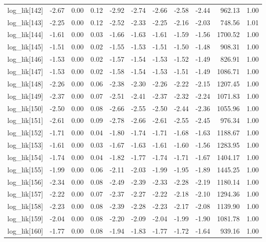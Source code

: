 \begin{table}[ht]
\begin{tabular}{rrrrrrrrrrr}
  log\_lik[142] & -2.67 & 0.00 & 0.12 & -2.92 & -2.74 & -2.66 & -2.58 & -2.44 & 962.13 & 1.00 \\ 
  log\_lik[143] & -2.25 & 0.00 & 0.12 & -2.52 & -2.33 & -2.25 & -2.16 & -2.03 & 748.56 & 1.01 \\ 
  log\_lik[144] & -1.61 & 0.00 & 0.03 & -1.66 & -1.63 & -1.61 & -1.59 & -1.56 & 1700.52 & 1.00 \\ 
  log\_lik[145] & -1.51 & 0.00 & 0.02 & -1.55 & -1.53 & -1.51 & -1.50 & -1.48 & 908.31 & 1.00 \\ 
  log\_lik[146] & -1.53 & 0.00 & 0.02 & -1.57 & -1.54 & -1.53 & -1.52 & -1.49 & 826.91 & 1.00 \\ 
  log\_lik[147] & -1.53 & 0.00 & 0.02 & -1.58 & -1.54 & -1.53 & -1.51 & -1.49 & 1086.71 & 1.00 \\ 
  log\_lik[148] & -2.26 & 0.00 & 0.06 & -2.38 & -2.30 & -2.26 & -2.22 & -2.15 & 1207.45 & 1.00 \\ 
  log\_lik[149] & -2.37 & 0.00 & 0.07 & -2.51 & -2.41 & -2.37 & -2.32 & -2.24 & 1071.83 & 1.00 \\ 
  log\_lik[150] & -2.50 & 0.00 & 0.08 & -2.66 & -2.55 & -2.50 & -2.44 & -2.36 & 1055.96 & 1.00 \\ 
  log\_lik[151] & -2.61 & 0.00 & 0.09 & -2.78 & -2.66 & -2.61 & -2.55 & -2.45 & 976.34 & 1.00 \\ 
  log\_lik[152] & -1.71 & 0.00 & 0.04 & -1.80 & -1.74 & -1.71 & -1.68 & -1.63 & 1188.67 & 1.00 \\ 
  log\_lik[153] & -1.61 & 0.00 & 0.03 & -1.67 & -1.63 & -1.61 & -1.60 & -1.56 & 1283.95 & 1.00 \\ 
  log\_lik[154] & -1.74 & 0.00 & 0.04 & -1.82 & -1.77 & -1.74 & -1.71 & -1.67 & 1404.17 & 1.00 \\ 
  log\_lik[155] & -1.99 & 0.00 & 0.06 & -2.11 & -2.03 & -1.99 & -1.95 & -1.89 & 1445.25 & 1.00 \\ 
  log\_lik[156] & -2.34 & 0.00 & 0.08 & -2.49 & -2.39 & -2.33 & -2.28 & -2.19 & 1180.14 & 1.00 \\ 
  log\_lik[157] & -2.22 & 0.00 & 0.07 & -2.37 & -2.27 & -2.22 & -2.18 & -2.10 & 1294.36 & 1.00 \\ 
  log\_lik[158] & -2.23 & 0.00 & 0.08 & -2.39 & -2.28 & -2.23 & -2.17 & -2.08 & 1139.90 & 1.00 \\ 
  log\_lik[159] & -2.04 & 0.00 & 0.08 & -2.20 & -2.09 & -2.04 & -1.99 & -1.90 & 1081.78 & 1.00 \\ 
  log\_lik[160] & -1.77 & 0.00 & 0.08 & -1.94 & -1.83 & -1.77 & -1.72 & -1.64 & 939.16 & 1.00 \\ 

\end{tabular}
\end{table}
